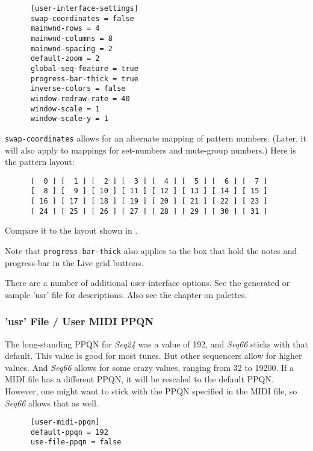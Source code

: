    \begin{verbatim}
      [user-interface-settings]
      swap-coordinates = false
      mainwnd-rows = 4
      mainwnd-columns = 8
      mainwnd-spacing = 2
      default-zoom = 2
      global-seq-feature = true
      progress-bar-thick = true
      inverse-colors = false
      window-redraw-rate = 40
      window-scale = 1
      window-scale-y = 1
   \end{verbatim}

   \texttt{swap-coordinates} allows for an alternate mapping of pattern
   numbers.  (Later, it will also apply to mappings for set-numbers and
   mute-group numbers.)  Here is the pattern layout:

   \begin{verbatim}
      [  0 ] [  1 ] [  2 ] [  3 ] [  4 ] [  5 ] [  6 ] [  7 ]
      [  8 ] [  9 ] [ 10 ] [ 11 ] [ 12 ] [ 13 ] [ 14 ] [ 15 ]
      [ 16 ] [ 17 ] [ 18 ] [ 19 ] [ 20 ] [ 21 ] [ 22 ] [ 23 ]
      [ 24 ] [ 25 ] [ 26 ] [ 27 ] [ 28 ] [ 29 ] [ 30 ] [ 31 ]
   \end{verbatim}

   Compare it to the layout shown in
   .

   Note that \texttt{progress-bar-thick} also applies to the box that hold the
   notes and progress-bar in the Live grid buttons.
 
   There are a number of additional user-interface options.  See the generated
   or sample 'usr' file for descriptions.  Also see the chapter on palettes.

\subsubsection{'usr' File / User MIDI PPQN}
\label{subsubsec:usr_file_user_midi_ppqn}

   The long-standing PPQN for \textsl{Seq24} was a value of 192, and
   \textsl{Seq66} sticks with that default.
   This value is good for most tunes. But other sequencers allow for higher
   values. And \textsl{Seq66} allows for some crazy values, ranging from
   32 to 19200.  If a MIDI file has a different PPQN, it will be rescaled to
   the default PPQN.  However, one might want to stick with the PPQN
   specified in the MIDI file, so \textsl{Seq66} allows that as well.

   \begin{verbatim}
      [user-midi-ppqn]
      default-ppqn = 192
      use-file-ppqn = false
   \end{verbatim}

